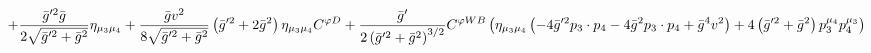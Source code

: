 %
\begin{dmath*}
%
  +  \frac{{\bar g}^{\prime 2} {\bar g}{}}{2 \sqrt{{\bar g}^{\prime 2} + {\bar g}{}^2}}\eta_{\mu_3 \mu_4}  +  \frac{{\bar g}{} v^2}{8 \sqrt{{\bar g}^{\prime 2} + {\bar g}{}^2}}\left({\bar g}^{\prime 2} + 2 {\bar g}{}^2\right) \eta_{\mu_3 \mu_4} C^{ \varphi  D}  +  \frac{{\bar g}^\prime}{2 \left({\bar g}^{\prime 2} + {\bar g}{}^2\right)^{3/2}}C^{ \varphi  WB} \left(\eta_{\mu_3 \mu_4} \left( - 4 {\bar g}^{\prime 2} p_{3}\nobreak\cdot\nobreak{}p_{4} - 4 {\bar g}{}^2 p_{3}\nobreak\cdot\nobreak{}p_{4} + {\bar g}{}^4 v^2\right) + 4 \left({\bar g}^{\prime 2} + {\bar g}{}^2\right) p_3^{\mu_4} p_4^{\mu_3}\right)
%
\end{dmath*}
%
